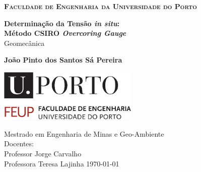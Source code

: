 \begin{titlepage}
\setlength{\headheight}{14pt}
    \begin{center}
        \large 
        \Large\textbf{{\scshape Faculdade de Engenharia da Universidade do Porto}}
        \vspace*{1.8cm}

        \huge
        \textbf{Determinação da Tensão \emph{in situ}:}\\
        \textbf{Método CSIRO \emph{Overcoring Gauge}} \\   
        \vspace{0.5cm}
        \LARGE
        Geomecânica

        \vspace{1cm}
        \Large
        \textbf{João Pinto dos Santos Sá Pereira}

        \vspace{3cm}

        \includegraphics[width=0.5\textwidth]{imagens/uporto-feup.pdf}
        \vspace{2cm}
        
        \large
        Mestrado em Engenharia de Minas e Geo-Ambiente\\
        \vspace{1cm}
        Docentes:\\
        Professor Jorge Carvalho \\
        Professora Teresa Lajinha
        \vfill
        \today
       
    \end{center}
\end{titlepage}
